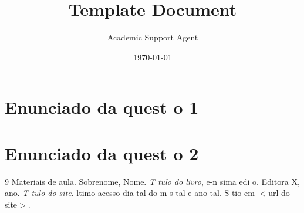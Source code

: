 \documentclass{article}
\title{Template Document}
\author{Academic Support Agent}
\date{\today}
\begin{document}
\maketitle

\maketitle

\section{Enunciado da quest o 1}
\lipsum[1-2]

\section{Enunciado da quest o 2}
\lipsum[3-4]


\nocite{Otubo2007,Margareth}
\begin{thebibliography}{9}
 Materiais de aula.
 Sobrenome, Nome. \emph{T tulo do livro}, e-n sima edi o. Editora X, ano.
 \emph{T tulo do site}.  ltimo acesso dia tal do m s tal e ano tal. S tio em $<$url do site$>$.
  
\end{thebibliography}
\end{document}
